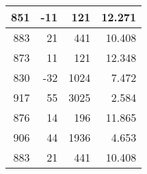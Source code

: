 \begin{longtable}{|r|r|r|r|}
	851                                                                                             & -11                                               & 121                                                  & 12.271                                                                                         \\ \hline
	883                                                                                             & 21                                                & 441                                                  & 10.408                                                                                         \\ \hline
	873                                                                                             & 11                                                & 121                                                  & 12.348                                                                                         \\ \hline
	830                                                                                             & -32                                               & 1024                                                 & 7.472                                                                                          \\ \hline
	917                                                                                             & 55                                                & 3025                                                 & 2.584                                                                                          \\ \hline
	876                                                                                             & 14                                                & 196                                                  & 11.865                                                                                         \\ \hline
	906                                                                                             & 44                                                & 1936                                                 & 4.653                                                                                          \\ \hline
	883                                                                                             & 21                                                & 441                                                  & 10.408                                                                                         \\ \hline

\end{longtable}
